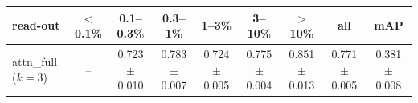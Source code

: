 \begin{tabular}{lcccccccc}
\toprule
read-out & $<$0.1\% & 0.1--0.3\% & 0.3--1\% & 1--3\% & 3--10\% & $>$10\% & all & mAP \\
\midrule
attn\_full ($k=3$) & -- & 0.723 $\pm$ 0.010 & 0.783 $\pm$ 0.007 & 0.724 $\pm$ 0.005 & 0.775 $\pm$ 0.004 & 0.851 $\pm$ 0.013 & 0.771 $\pm$ 0.005 & 0.381 $\pm$ 0.008 \\
\bottomrule
\end{tabular}
